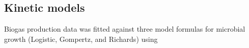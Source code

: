 \subsection{Kinetic models}
Biogas production data was fitted against three model formulas for microbial growth (Logistic, Gompertz, and Richards)  using 